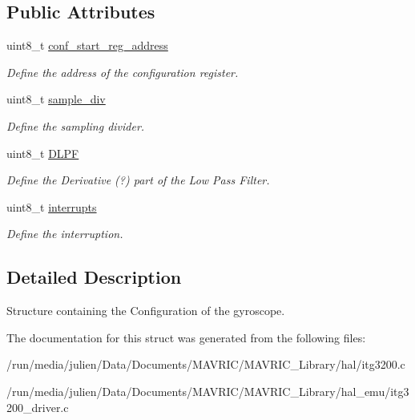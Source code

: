 \subsection*{Public Attributes}
\begin{DoxyCompactItemize}
\item 
\hypertarget{structgyro__config_a5683bc77921f8061c71d6dc8f4dd3bee}{uint8\+\_\+t \hyperlink{structgyro__config_a5683bc77921f8061c71d6dc8f4dd3bee}{conf\+\_\+start\+\_\+reg\+\_\+address}}\label{structgyro__config_a5683bc77921f8061c71d6dc8f4dd3bee}

\begin{DoxyCompactList}\small\item\em Define the address of the configuration register. \end{DoxyCompactList}\item 
\hypertarget{structgyro__config_afe4047b72932b3d4bb0fe5c3a7c93174}{uint8\+\_\+t \hyperlink{structgyro__config_afe4047b72932b3d4bb0fe5c3a7c93174}{sample\+\_\+div}}\label{structgyro__config_afe4047b72932b3d4bb0fe5c3a7c93174}

\begin{DoxyCompactList}\small\item\em Define the sampling divider. \end{DoxyCompactList}\item 
\hypertarget{structgyro__config_a5397c5e444e1c2d04e776ed444deae1a}{uint8\+\_\+t \hyperlink{structgyro__config_a5397c5e444e1c2d04e776ed444deae1a}{D\+L\+P\+F}}\label{structgyro__config_a5397c5e444e1c2d04e776ed444deae1a}

\begin{DoxyCompactList}\small\item\em Define the Derivative (?) part of the Low Pass Filter. \end{DoxyCompactList}\item 
\hypertarget{structgyro__config_ab1bc6a6a55ed2fac02fa92bfca1be58a}{uint8\+\_\+t \hyperlink{structgyro__config_ab1bc6a6a55ed2fac02fa92bfca1be58a}{interrupts}}\label{structgyro__config_ab1bc6a6a55ed2fac02fa92bfca1be58a}

\begin{DoxyCompactList}\small\item\em Define the interruption. \end{DoxyCompactList}\end{DoxyCompactItemize}


\subsection{Detailed Description}
Structure containing the Configuration of the gyroscope. 

The documentation for this struct was generated from the following files\+:\begin{DoxyCompactItemize}
\item 
/run/media/julien/\+Data/\+Documents/\+M\+A\+V\+R\+I\+C/\+M\+A\+V\+R\+I\+C\+\_\+\+Library/hal/itg3200.\+c\item 
/run/media/julien/\+Data/\+Documents/\+M\+A\+V\+R\+I\+C/\+M\+A\+V\+R\+I\+C\+\_\+\+Library/hal\+\_\+emu/itg3200\+\_\+driver.\+c\end{DoxyCompactItemize}
